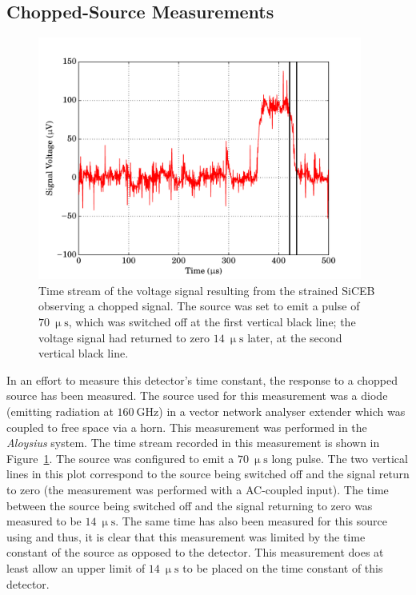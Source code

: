 %
\subsection{Chopped-Source Measurements}\label{ssec:opticalStrainedSi_chopped}
\begin{figure}[tb]
\begin{center}
\includegraphics[width = 0.95\textwidth]{figures/strained_pulseWidth}
\caption[Time stream of the voltage signal resulting from the strained SiCEB observing a chopped signal]{Time stream of the voltage signal resulting from the strained SiCEB observing a chopped signal. The source was set to emit a pulse of $70~\mathrm{\upmu s}$, which was switched off at the first vertical black line; the voltage signal had returned to zero $14~\mathrm{\upmu s}$ later, at the second vertical black line.}
\label{fig:strainedChopped_time}
\end{center}
\end{figure}
In an effort to measure this detector's time constant, the response to a chopped source has been measured. The source used for this measurement was a diode (emitting radiation at $160~\mathrm{GHz}$) in a vector network analyser extender which was coupled to free space via a horn. This measurement was performed in the \textit{Aloysius} system. The time stream recorded in this measurement is shown in Figure~\ref{fig:strainedChopped_time}. The source was configured to emit a $70~\mathrm{\upmu s}$ long pulse. The two vertical lines in this plot correspond to the source being switched off and the signal return to zero (the measurement was performed with a AC-coupled input). The time between the source being switched off and the signal returning to zero was measured to be $14~\mathrm{\upmu s}$. The same time has also been measured for this source using  and thus, it is clear that this measurement was limited by the time constant of the source as opposed to the detector. This measurement does at least allow an upper limit of $14~\mathrm{\upmu s}$ to be placed on the time constant of this detector. 
